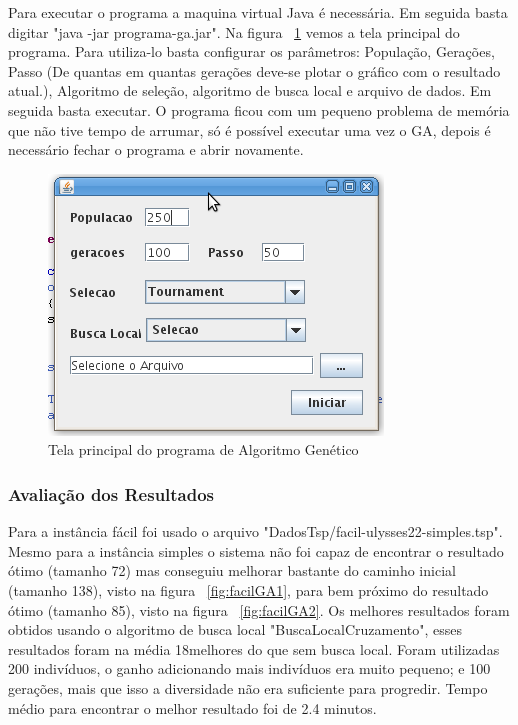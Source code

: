 \documentclass{acm_proc_article-sp}
\begin{document}
Para executar o programa a maquina virtual Java é necessária. Em seguida basta digitar "java -jar programa-ga.jar". Na figura ~\ref{fig:telaGA} vemos a tela principal do programa. Para utiliza-lo basta configurar os parâmetros: População, Gerações, Passo (De quantas em quantas gerações deve-se plotar o gráfico com o resultado atual.), Algoritmo de seleção, algoritmo de busca local e arquivo de dados. Em seguida basta executar.
O programa ficou com um pequeno problema de memória que não tive tempo de arrumar, só é possível executar uma vez o GA, depois é necessário fechar o programa e abrir novamente.

\begin{figure}[ht]
 \begin{center}
  \includegraphics[scale=0.5]{imagens/ga_telaprincipal.png} 
  \caption{Tela principal do programa de Algoritmo Genético}
  \label{fig:telaGA}
 \end{center}
\end{figure}

\subsubsection{Avaliação dos Resultados}
Para a instância fácil foi usado o arquivo "DadosTsp/facil-ulysses22-simples.tsp". Mesmo para a instância simples o sistema não foi capaz de encontrar o resultado ótimo (tamanho 72) mas conseguiu melhorar bastante do caminho inicial (tamanho 138), visto na figura ~\ref{fig:facilGA1}, para bem próximo do resultado ótimo (tamanho 85), visto na figura ~\ref{fig:facilGA2}. Os melhores resultados foram obtidos usando o algoritmo de busca local "BuscaLocalCruzamento", esses resultados foram na média 18\textdiscount melhores do que sem busca local. Foram utilizadas 200 indivíduos, o ganho adicionando mais indivíduos era muito pequeno; e 100 gerações, mais que isso a diversidade não era suficiente para progredir. Tempo médio para encontrar o melhor resultado foi de 2.4 minutos.
\end{document}
